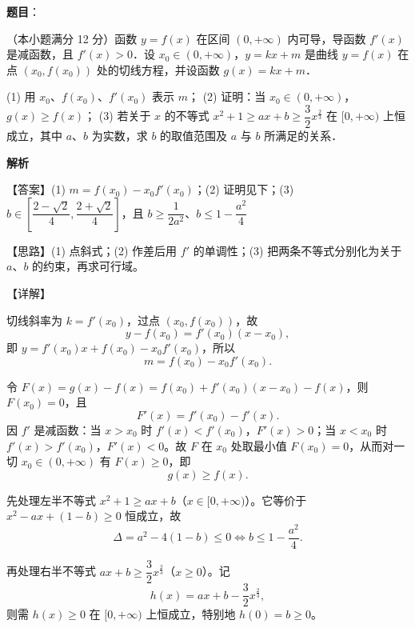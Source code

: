 \begin{answer}

\textbf{题目}：

（本小题满分 12 分）函数 $y = f(x)$ 在区间 $(0, +\infty)$ 内可导，导函数 $f'(x)$ 是减函数，且 $f'(x) > 0$．设 $x_0 \in (0, +\infty)$，$y = kx + m$ 是曲线 $y = f(x)$ 在点 $(x_0, f(x_0))$ 处的切线方程，并设函数 $g(x) = kx + m$．

(1) 用 $x_0$、$f(x_0)$、$f'(x_0)$ 表示 $m$；
(2) 证明：当 $x_0 \in (0, +\infty)$，$g(x) \geqslant f(x)$；
(3) 若关于 $x$ 的不等式 $x^2 + 1 \geqslant ax + b \geqslant \dfrac{3}{2}x^{\frac{2}{3}}$ 在 $[0, +\infty)$ 上恒成立，其中 $a$、$b$ 为实数，求 $b$ 的取值范围及 $a$ 与 $b$ 所满足的关系．

\textbf{解析}

【答案】(1) $m = f(x_0) - x_0f'(x_0)$；(2) 证明见下；(3) $b \in \left[\dfrac{2-\sqrt{2}}{4}, \dfrac{2+\sqrt{2}}{4}\right]$，且 $b \geqslant \dfrac{1}{2a^2}$、$b \leqslant 1 - \dfrac{a^2}{4}$

【思路】(1) 点斜式；(2) 作差后用 $f'$ 的单调性；(3) 把两条不等式分别化为关于 $a$、$b$ 的约束，再求可行域。

【详解】


切线斜率为 $k = f'(x_0)$，过点 $(x_0, f(x_0))$，故
\nopagebreak[4]
\[
y - f(x_0) = f'(x_0)(x - x_0),
\]
即 $y = f'(x_0)x + f(x_0) - x_0f'(x_0)$，所以
\nopagebreak[4]
\[
m = f(x_0) - x_0f'(x_0).
\]


令 $F(x) = g(x) - f(x) = f(x_0) + f'(x_0)(x-x_0) - f(x)$，则 $F(x_0) = 0$，且
\nopagebreak[4]
\[
F'(x) = f'(x_0) - f'(x).
\]
因 $f'$ 是减函数：当 $x > x_0$ 时 $f'(x) < f'(x_0)$，$F'(x) > 0$；当 $x < x_0$ 时 $f'(x) > f'(x_0)$，$F'(x) < 0$。故 $F$ 在 $x_0$ 处取最小值 $F(x_0) = 0$，从而对一切 $x_0 \in (0,+\infty)$ 有 $F(x) \geqslant 0$，即
\nopagebreak[4]
\[
g(x) \geqslant f(x).
\]


先处理左半不等式 $x^2 + 1 \geqslant ax + b$（$x \in [0,+\infty)$）。它等价于 $x^2 - ax + (1-b) \geqslant 0$ 恒成立，故
\nopagebreak[4]
\[
\Delta = a^2 - 4(1-b) \leqslant 0 \iff b \leqslant 1 - \frac{a^2}{4}.
\]

再处理右半不等式 $ax + b \geqslant \dfrac{3}{2}x^{\frac{2}{3}}$（$x \geqslant 0$）。记
\nopagebreak[4]
\[
h(x) = ax + b - \frac{3}{2}x^{\frac{2}{3}},
\]
则需 $h(x) \geqslant 0$ 在 $[0,+\infty)$ 上恒成立，特别地 $h(0) = b \geqslant 0$。


\end{answer}

